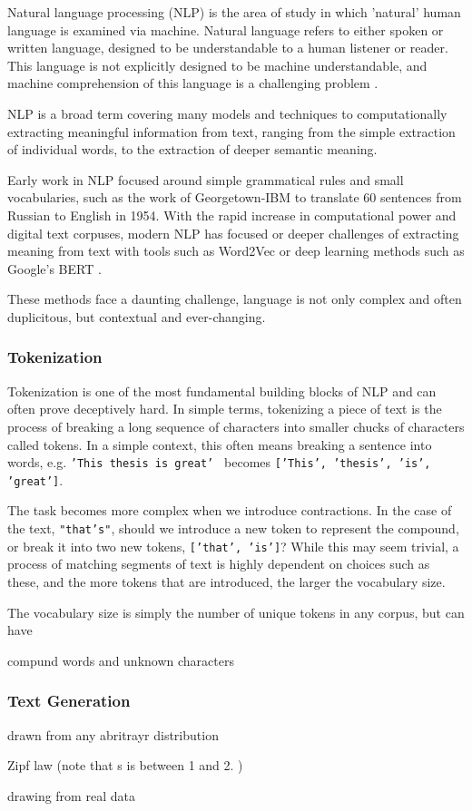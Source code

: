 Natural language processing (NLP) is the area of study in which 'natural' human language is examined via machine. Natural language refers to either spoken or written language, designed to be understandable to a human listener or reader. This language is not explicitly designed to be machine understandable, and machine comprehension of this language is a challenging problem .

NLP is a broad term covering many models and techniques to computationally extracting meaningful information from text, ranging from the simple extraction of individual words, to the extraction of deeper semantic meaning. 

Early work in NLP focused around simple grammatical rules and small vocabularies, such as the work of Georgetown-IBM  to translate 60 sentences from Russian to English in 1954. With the rapid increase in computational power and digital text corpuses, modern NLP has focused or deeper challenges of extracting meaning from text with tools such as Word2Vec  or deep learning methods such as Google's BERT .

These methods face a daunting challenge, language is not only complex and often duplicitous, but contextual and ever-changing. 

\subsubsection{Tokenization}\label{sec:tokenization}
Tokenization is one of the most fundamental building blocks of NLP and can often prove deceptively hard. In simple terms, tokenizing a piece of text is the process of breaking a long sequence of characters into smaller chucks of characters called tokens. In a simple context, this often means breaking a sentence into words, e.g. \texttt{'This thesis is great' } becomes \texttt{['This', 'thesis', 'is',  'great']}.

The task becomes more complex when we introduce contractions. In the case of the text, \texttt{"that's"}, should we introduce a new token to represent the compound, or break it into two new tokens, \texttt{['that', 'is']}? While this may seem trivial, a process of matching segments of text is highly dependent on choices such as these, and the more tokens that are introduced, the larger the vocabulary size.

The vocabulary size is simply the number of unique tokens in any corpus, but can have 

compund words and unknown characters


\subsubsection{Text Generation}\label{sec:textgeneration}

drawn from any abritrayr distribution

Zipf law (note that s is between 1 and 2. )


drawing from real data

